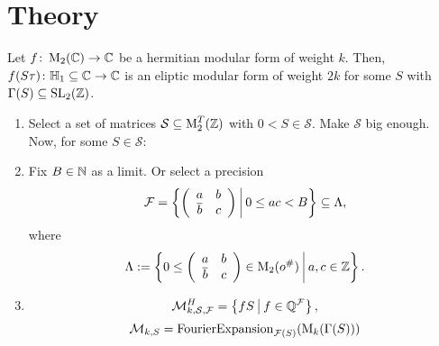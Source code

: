 
\section{Theory}


\begin{lemma}
Let $f \colon \operatorname{M}_2(\mathbb{C}) \rightarrow \mathbb{C}$ be a hermitian modular form of weight $k$.
Then, $f(S \tau) \colon \mathbb{H}_1 \subseteq \mathbb{C} \rightarrow \mathbb{C}$ is an eliptic modular form of weight $2k$ for some $S$ with $\Gamma(S) \subseteq \operatorname{SL}_2(\mathbb{Z})$.
\end{lemma}



\begin{algo}
\begin{enumerate}
\item Select a set of matrices $\mathcal{S} \subseteq \operatorname{M}_2^T(\mathbb{Z})$ with $0 < S \in \mathcal{S}$. Make $\mathcal{S}$ big enough. Now, for some $S \in \mathcal{S}$:

\item Fix $B \in \mathbb{N}$ as a limit. Or select a precision
\[ \F = \Set{\SmallMatrix{a}{b}{\overline b}{c}}{0 \le a c < B} \subseteq \Lambda , \]
where
\[ \Lambda := \Set{0 \le \SmallMatrix{a}{b}{\overline b}{c} \in \M_2(o^\#)}{a,c \in \Z } . \]

\item \[ \mathcal{M}_{k,\mathcal{S},\F}^H = \Set{f S}{f \in \Q^\F} , \]
\[ \mathcal{M}_{k,S} = \textup{\textrm{FourierExpansion}}_{\mathcal{F}(S)}(\operatorname{M}_k(\Gamma(S))) \]

\end{enumerate}
\end{algo}
